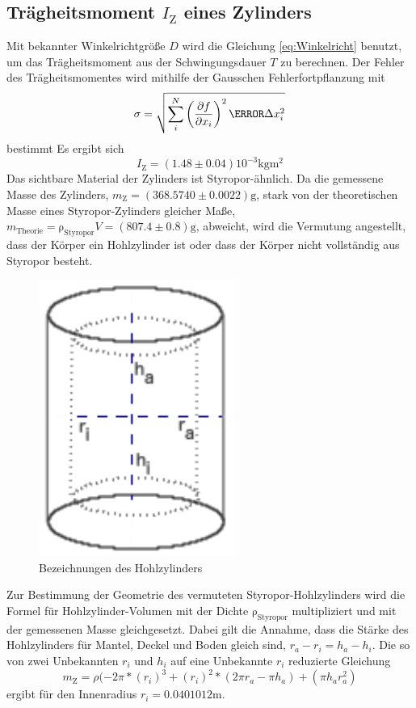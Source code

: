 \subsection{Trägheitsmoment $I_\text{Z}$ eines Zylinders}
\label{sub:traegheitsmoment_eines_zylinders}

Mit bekannter Winkelrichtgröße $D$ wird die Gleichung \eqref{eq:Winkelricht} benutzt, um das Trägheitsmoment aus der Schwingungsdauer $T$ zu berechnen. Der Fehler des Trägheitsmomentes wird mithilfe der Gausschen Fehlerfortpflanzung mit
\begin{equation}
	\label{eq:Gauss}
	\sigma=\sqrt{\sum_i^N{\left( \frac{\partial{f}}{\partial{x_i}}\right)^2\m \Delta x_i^2}}
\end{equation}bestimmt
Es ergibt sich
\begin{equation}
	\label{wert:Zylinder}
	I_\text{Z} = (1.48\pm0.04)10^{-3} \si{\kilo\gram\meter\squared}
\end{equation}
Das sichtbare Material der Zylinders ist Styropor-ähnlich. 
Da die gemessene Masse des Zylinders, $m_\text{Z} = (368.5740\pm0.0022) \si{\gram}$, stark von der theoretischen Masse eines Styropor-Zylinders gleicher Maße, $m_\text{Theorie} = \mathup{\rho_{\text{Styropor}}}V=(807.4\pm0.8) \si{\gram}$, abweicht, 
wird die Vermutung angestellt, dass der Körper ein Hohlzylinder ist oder dass der Körper nicht vollständig aus Styropor besteht.
\begin{figure}[b]
	\label{fig:tonne}
	\centering
	\includegraphics[scale=0.5]{Bilder/Tonne.pdf}
	\caption{Bezeichnungen des Hohlzylinders}
\end{figure}
Zur Bestimmung der Geometrie des vermuteten Styropor-Hohlzylinders wird die Formel für Hohlzylinder-Volumen  mit der Dichte $\mathup{\rho_{\text{Styropor}}}$ multipliziert und mit der gemessenen Masse gleichgesetzt. 
Dabei gilt die Annahme, dass die Stärke des Hohlzylinders für Mantel, Deckel und Boden gleich sind, $r_a-r_i=h_a-h_i$. 
Die so von zwei Unbekannten $r_i$ und $h_i$ auf eine Unbekannte $r_i$ reduzierte Gleichung
\begin{equation}
	m_\text{Z}=\rho(-2\pi*(r_i)^3+(r_i)^2*(2\pi r_a-\pi h_a)+(\pi h_a r_a^2)
\end{equation}
ergibt für den Innenradius $r_i = 0.0401012\si{\meter}$.

